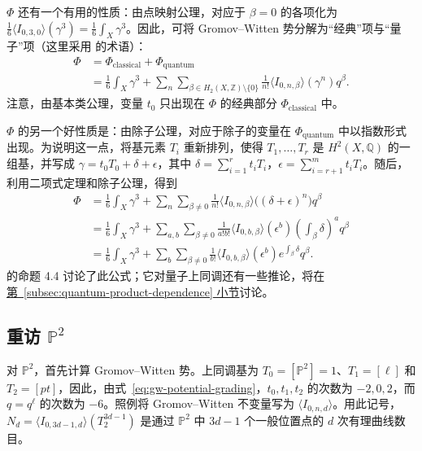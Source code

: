 $\Phi$ 还有一个有用的性质：由点映射公理，对应于 $\beta=0$ 的各项化为 $\tfrac16\langle I_{0,3,0}\rangle(\gamma^3)=\tfrac16\int_X\gamma^3$。因此，可将 Gromov--Witten 势分解为“经典”项与“量子”项（这里采用  的术语）：
\[
\begin{aligned}
\Phi&=\Phi_{\mathrm{classical}}+\Phi_{\mathrm{quantum}}\\
&=\frac16\int_X\gamma^3+
\sum_n\sum_{\beta\in H_2(X,\mathbb Z)\setminus\{0\}}
\frac1{n!}\langle I_{0,n,\beta}\rangle(\gamma^n)q^\beta.
\end{aligned}
\]
注意，由基本类公理，变量 $t_0$ 只出现在 $\Phi$ 的经典部分 $\Phi_{\mathrm{classical}}$ 中。

$\Phi$ 的另一个好性质是：由除子公理，对应于除子的变量在 $\Phi_{\mathrm{quantum}}$ 中以指数形式出现。为说明这一点，将基元素 $T_i$ 重新排列，使得 $T_1,\ldots,T_r$ 是 $H^2(X,\mathbb Q)$ 的一组基，并写成
$\gamma=t_0T_0+\delta+\epsilon$，其中 $\delta=\sum_{i=1}^rt_iT_i$，$\epsilon=\sum_{i=r+1}^mt_iT_i$。随后，利用二项式定理和除子公理，得到
\begin{equation}\label{eq:gw-potential-divisor-exponential}
\begin{aligned}
\Phi&=\frac16\int_X\gamma^3+\sum_n\sum_{\beta\ne0}
\frac1{n!}\langle I_{0,n,\beta}\rangle\bigl((\delta+\epsilon)^n\bigr)q^\beta\\
&=\frac16\int_X\gamma^3+\sum_{a,b}\sum_{\beta\ne0}
\frac1{a!b!}\langle I_{0,b,\beta}\rangle(\epsilon^b)
\left(\int_\beta\delta\right)^a q^\beta\\
&=\frac16\int_X\gamma^3+\sum_b\sum_{\beta\ne0}
\frac1{b!}\langle I_{0,b,\beta}\rangle(\epsilon^b)e^{\int_\beta\delta}q^\beta.
\end{aligned}
\end{equation}
 的命题 4.4 讨论了此公式；它对量子上同调还有一些推论，将在\hyperref[subsec:quantum-product-dependence]{第~\ref*{subsec:quantum-product-dependence} 小节}讨论。

\subsection{重访 $\mathbb P^2$}\label{subsec:plane-gw-potential}
对 $\mathbb P^2$，首先计算 Gromov--Witten 势。上同调基为 $T_0=[\mathbb P^2]=1$、$T_1=[\ell]$ 和 $T_2=[pt]$，因此，由式~\eqref{eq:gw-potential-grading}，$t_0,t_1,t_2$ 的次数为 $-2,0,2$，而 $q=q^\ell$ 的次数为 $-6$。照例将 Gromov--Witten 不变量写为 $\langle I_{0,n,d}\rangle$。用此记号，$N_d=\langle I_{0,3d-1,d}\rangle(T_2^{3d-1})$ 是通过 $\mathbb P^2$ 中 $3d-1$ 个一般位置点的 $d$ 次有理曲线数目。

